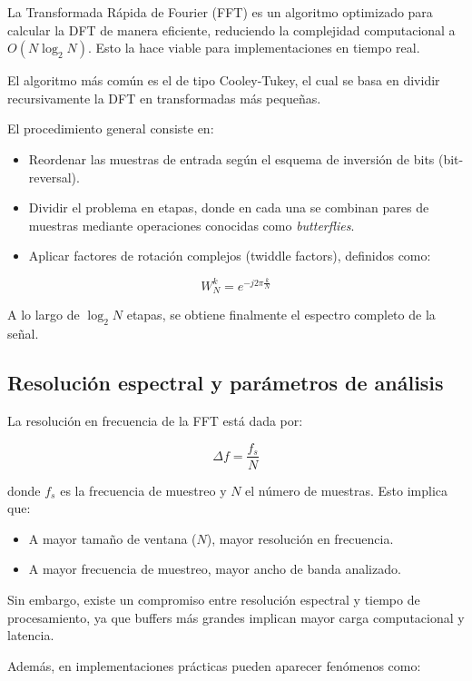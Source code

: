 \documentclass[12pt]{article}
\begin{document}
    La Transformada Rápida de Fourier (FFT) es un algoritmo optimizado para calcular la DFT de manera eficiente, reduciendo la complejidad computacional a $O(N \log_2 N)$. Esto la hace viable para implementaciones en tiempo real.

    El algoritmo más común es el de tipo Cooley-Tukey, el cual se basa en dividir recursivamente la DFT en transformadas más pequeñas.

    El procedimiento general consiste en:

    \begin{itemize}
        \item Reordenar las muestras de entrada según el esquema de inversión de bits (bit-reversal).
        \item Dividir el problema en etapas, donde en cada una se combinan pares de muestras mediante operaciones conocidas como \textit{butterflies}.
        \item Aplicar factores de rotación complejos (twiddle factors), definidos como:
    \end{itemize}

    \[
    W_N^k = e^{-j 2\pi \frac{k}{N}}
    \]

    \noindent
    A lo largo de $\log_2 N$ etapas, se obtiene finalmente el espectro completo de la señal.

    \subsection{Resolución espectral y parámetros de análisis}

    La resolución en frecuencia de la FFT está dada por:

    \[
    \Delta f = \frac{f_s}{N}
    \]
 
    donde $f_s$ es la frecuencia de muestreo y $N$ el número de muestras. Esto implica que:

    \begin{itemize} 
        \item A mayor tamaño de ventana ($N$), mayor resolución en frecuencia.
        \item A mayor frecuencia de muestreo, mayor ancho de banda analizado.
    \end{itemize}

    Sin embargo, existe un compromiso entre resolución espectral y tiempo de procesamiento, ya que buffers más grandes implican mayor carga computacional y latencia.

    Además, en implementaciones prácticas pueden aparecer fenómenos como:
\end{document}
